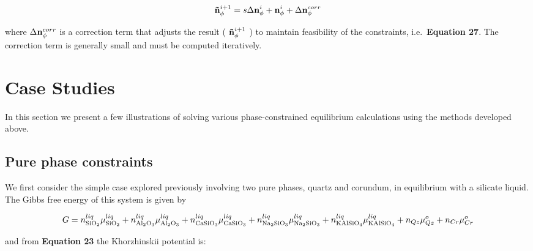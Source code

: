 \documentclass[11pt, titlepage, twoside]{article}
\begin{document}
\begin{MPEquation}[!ht]
\begin{equation}
{\bf{\tilde n}}_\phi ^{i + 1} = s\Delta {\bf{n}}_\phi ^i + {\bf{n}}_\phi ^i + \Delta {\bf{n}}_\phi ^{corr}
\end{equation}
\label{MPEquationElement:0A878B2F-6027-4853-EFB2-E7AD7F232648}
\end{MPEquation}
where $\Delta {\bf{n}}_\phi ^{corr}$ is a correction term that adjusts the result ( ${\bf{\tilde n}}_\phi ^{i + 1}$ ) to maintain feasibility of the constraints, i.e.\ \textbf{Equation 27}. The correction term is generally small and must be computed iteratively.


\section{Case Studies}\label{MPSection:128B24A0-DD5B-4E0D-9B46-92BDD2CF4B3C}

In this section we present a few illustrations of solving various phase-constrained equilibrium calculations using the methods developed above.


\subsection{Pure phase constraints}\label{MPSection:27B956EC-6DAC-4346-CEA5-7BF8226F9953}

We first consider the simple case explored previously involving two pure phases, quartz and corundum, in equilibrium with a silicate liquid. The Gibbs free energy of this system is given by


\begin{MPEquation}[!ht]
\begin{equation}
G = n_{{\rm{Si}}{{\rm{O}}_2}}^{liq}\mu _{{\rm{Si}}{{\rm{O}}_2}}^{liq} + n_{{\rm{A}}{{\rm{l}}_2}{{\rm{O}}_3}}^{liq}\mu _{{\rm{A}}{{\rm{l}}_2}{{\rm{O}}_3}}^{liq} + n_{{\rm{CaSi}}{{\rm{O}}_3}}^{liq}\mu _{{\rm{CaSi}}{{\rm{O}}_3}}^{liq} + n_{{\rm{N}}{{\rm{a}}_{\rm{2}}}{\rm{Si}}{{\rm{O}}_3}}^{liq}\mu _{{\rm{N}}{{\rm{a}}_{\rm{2}}}{\rm{Si}}{{\rm{O}}_3}}^{liq} + n_{{\rm{KAlSi}}{{\rm{O}}_4}}^{liq}\mu _{{\rm{KAlSi}}{{\rm{O}}_4}}^{liq} + {n_{Qz}}\mu _{Qz}^o + {n_{Cr}}\mu _{Cr}^o
\end{equation}
\label{MPEquationElement:427C80A9-4BC1-434E-BF39-ABD703588828}
\end{MPEquation}
and from \textbf{Equation 23} the Khorzhinskii potential is:
\end{document}

